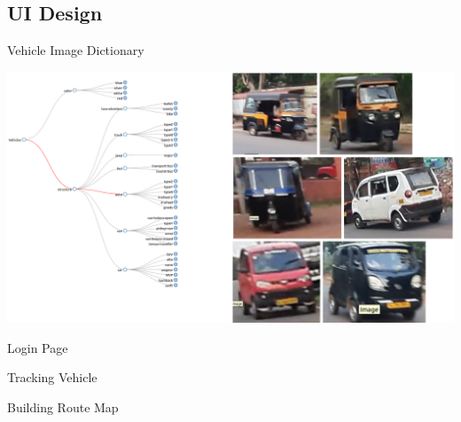 \documentclass{beamer}
\begin{document}
	\subsection{UI Design}
	\begin{frame}{Vehicle Image Dictionary}
		\begin{center}
			\includegraphics[width=\linewidth]{res/image_dictionary.png}
		\end{center}
	\end{frame}

	\begin{frame}{Login Page}
		\begin{center}
		\end{center}
 	\end{frame}
 
	 \begin{frame}{Tracking Vehicle}
	 	\begin{center}
	 	\end{center}
	 \end{frame}
 
	 \begin{frame}{Building Route Map}
		\begin{center}
		\end{center}
	\end{frame}

	

	
	


\end{document}
